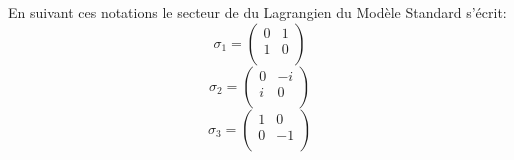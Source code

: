 En suivant ces notations le secteur de  du Lagrangien du Modèle Standard s'écrit:
\marginpar
{
\begin{equation*}
\sigma_{1}=\begin{pmatrix} 
0&1\\
1&0\\
\end{pmatrix}
\end{equation*}
\vspace{0.2cm}
\begin{equation*}
\sigma_{2}=\begin{pmatrix} 
0&-i\\
i&0\\
\end{pmatrix}
\end{equation*}
\vspace{0.2cm}
\begin{equation*}
\sigma_{3}=\begin{pmatrix} 
1&0\\
0&-1\\
\end{pmatrix}
\end{equation*}
\label{Pauli}
}
\marginpar
